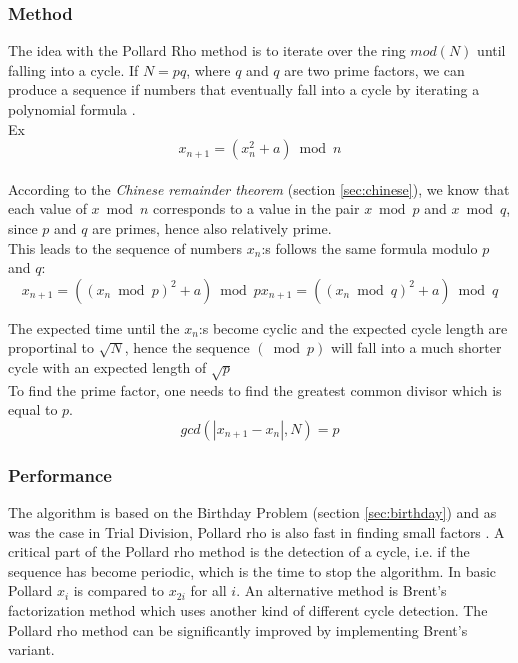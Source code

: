 \documentclass[a4paper, 12pt]{report}
\begin{document}
\subsubsection{Method}
The idea with the Pollard Rho method is to iterate over the ring $mod(N)$ until falling into a cycle. If $N = pq$, where $q$ and $q$ are two prime factors, we can produce a sequence if numbers that eventually fall into a cycle by iterating a polynomial formula \cite{pollard}. \\
Ex 
\begin{equation}
x_{n+1} = (x_n^2 + a) \bmod n
\end{equation} \\
According to the \emph{Chinese remainder theorem} (section \ref{sec:chinese}), we know that each value of $x \bmod n$ corresponds to a value in the pair $x \bmod p$ and $x \bmod q$, since $p$ and $q$ are primes, hence also relatively prime. 
\\
This leads to the sequence of numbers $x_n$:s follows the same formula modulo $p$ and $q$:
\begin{equation}
	x_{n+1} = ((x_n \bmod p)^2 + a) \bmod p
	x_{n+1} = ((x_n \bmod q)^2 + a) \bmod q
\end{equation}

The expected time until the $x_n$:s become cyclic and the expected cycle length are proportinal to $\sqrt{N}$, hence the sequence $(\bmod p)$ will fall into a much shorter cycle with an expected length of $\sqrt{p}$
\\
To find the prime factor, one needs to find the greatest common divisor which is equal to $p$.
\begin{equation}
gcd(|x_{n+1} - x_n|, N) = p
\end{equation}

\subsubsection{Performance}
The algorithm is based on the Birthday Problem (section \ref{sec:birthday}) and as was the case in Trial Division, Pollard rho is also fast in finding small factors \cite{pollard}. A critical part of the Pollard rho method is the detection of a cycle, i.e. if the sequence has become periodic, which is the time to stop the algorithm. In basic Pollard $x_i$ is compared to $x_{2i}$ for all $i$. An alternative method is Brent's factorization method which uses another kind of different cycle detection. The Pollard rho method can be significantly improved by implementing Brent's variant.
\end{document}
